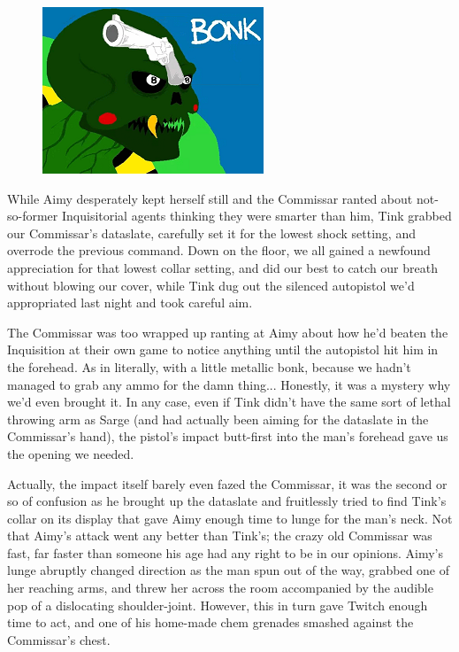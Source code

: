 \begin{figure}
	\begin{center}
		\includegraphics[width=\figwidth]{pics/21/64.png}
	\end{center}
\end{figure}
While Aimy desperately kept herself still and the Commissar ranted about not-so-former Inquisitorial agents thinking they were smarter than him, Tink grabbed our Commissar's dataslate, carefully set it for the lowest shock setting, and overrode the previous command. 
Down on the floor, we all gained a newfound appreciation for that lowest collar setting, and did our best to catch our breath without blowing our cover, while Tink dug out the silenced autopistol we'd appropriated last night and took careful aim.

The Commissar was too wrapped up ranting at Aimy about how he'd beaten the Inquisition at their own game to notice anything until the autopistol hit him in the forehead. 
As in literally, with a little metallic bonk, because we hadn't managed to grab any ammo for the damn thing... 
Honestly, it was a mystery why we'd even brought it. 
In any case, even if Tink didn't have the same sort of lethal throwing arm as Sarge (and had actually been aiming for the dataslate in the Commissar's hand), the pistol's impact butt-first into the man's forehead gave us the opening we needed. 


Actually, the impact itself barely even fazed the Commissar, it was the second or so of confusion as he brought up the dataslate and fruitlessly tried to find Tink's collar on its display that gave Aimy enough time to lunge for the man's neck. 
Not that Aimy's attack went any better than Tink's; 
the crazy old Commissar was fast, far faster than someone his age had any right to be in our opinions. 
Aimy's lunge abruptly changed direction as the man spun out of the way, grabbed one of her reaching arms, and threw her across the room accompanied by the audible pop of a dislocating shoulder-joint. 
However, this in turn gave Twitch enough time to act, and one of his home-made chem grenades smashed against the Commissar's chest.


